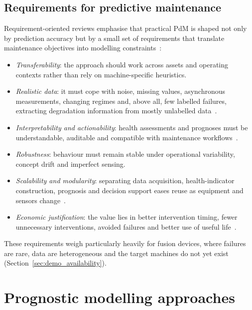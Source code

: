 \documentclass{book}
\begin{document}
\subsection{Requirements for predictive maintenance}
\label{sec:pdm_requirements}

Requirement-oriented reviews emphasise that practical PdM is shaped not only
by prediction accuracy but by a small set of requirements that translate
maintenance objectives into modelling
constraints~\cite{MaFlaniganBerges2024Requirements,NordalElThalji2021,NunesSantosRocha2023}:
\begin{itemize}
  \item \emph{Transferability}: the approach should work across assets and
    operating contexts rather than rely on machine-specific heuristics.
  \item \emph{Realistic data}: it must cope with noise, missing values,
    asynchronous measurements, changing regimes and, above all, few labelled
    failures, extracting degradation information from mostly unlabelled
    data~\cite{NunesSantosRocha2023,WenEtAl2022}.
  \item \emph{Interpretability and actionability}: health assessments and
    prognoses must be understandable, auditable and compatible with
    maintenance workflows~\cite{MaFlaniganBerges2024Requirements,LiVerhagenCurran2020}.
  \item \emph{Robustness}: behaviour must remain stable under operational
    variability, concept drift and imperfect sensing.
  \item \emph{Scalability and modularity}: separating data acquisition,
    health-indicator construction, prognosis and decision support eases reuse
    as equipment and sensors
    change~\cite{MaFlaniganBerges2024Requirements,MathWorksPdMWorkflow}.
  \item \emph{Economic justification}: the value lies in better intervention
    timing, fewer unnecessary interventions, avoided failures and better use
    of useful life~\cite{MaFlaniganBerges2024Requirements,WenEtAl2022}.
\end{itemize}
These requirements weigh particularly heavily for fusion devices, where
failures are rare, data are heterogeneous and the target machines do not yet
exist (Section~\ref{sec:demo_availability}).

\section{Prognostic modelling approaches}
\label{sec:pdm_paradigms}
\end{document}
